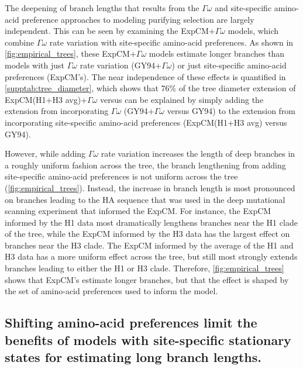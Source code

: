 \documentclass[11pt]{article}
\begin{document}
The deepening of branch lengths that results from the $\Gamma\omega$ and site-specific amino-acid preference approaches to modeling purifying selection are largely independent.
This can be seen by examining the ExpCM+$\Gamma\omega$ models, which combine $\Gamma\omega$ rate variation with site-specific amino-acid preferences.
As shown in \ref{fig:empirical_trees}, these ExpCM+$\Gamma\omega$ models estimate longer branches than models with just $\Gamma\omega$ rate variation (GY94+$\Gamma\omega$) or just site-specific amino-acid preferences (ExpCM's).
The near independence of these effects is quantified in \ref{supptab:tree_diameter}, which shows that 76\% of the tree diameter extension of ExpCM(H1+H3 avg)+$\Gamma\omega$ versus can be explained by simply adding the extension from incorporating $\Gamma\omega$ (GY94+$\Gamma\omega$ versus GY94) to the extension from incorporating site-specific amino-acid preferences (ExpCM(H1+H3 avg) versus GY94).

However, while adding $\Gamma\omega$ rate variation increases the length of deep branches in a roughly uniform fashion across the tree, the branch lengthening from adding site-specific amino-acid preferences is not uniform across the tree (\ref{fig:empirical_trees}). 
Instead, the increase in branch length is most pronounced on branches leading to the HA sequence that was used in the deep mutational scanning experiment that informed the ExpCM.
For instance, the ExpCM informed by the H1 data most dramatically lengthens branches near the H1 clade of the tree, while the ExpCM informed by the H3 data has the largest effect on branches near the H3 clade.
The ExpCM informed by the average of the H1 and H3 data has a more uniform effect across the tree, but still most strongly extends branches leading to either the H1 or H3 clade.
Therefore, \ref{fig:empirical_trees} shows that ExpCM's estimate longer branches, but that the effect is shaped by the set of amino-acid preferences used to inform the model.

\subsection*{Shifting amino-acid preferences limit the benefits of models with site-specific stationary states for estimating long branch lengths.}
\end{document}

